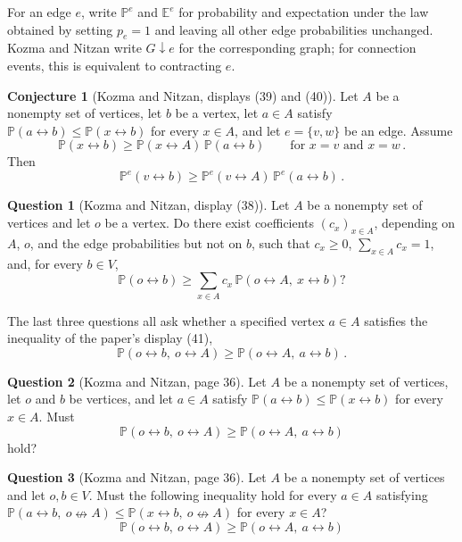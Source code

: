 \documentclass[11pt]{article}
\theoremstyle{definition}
\newtheorem{conjecture}{Conjecture}
\newtheorem{question}{Question}
\theoremstyle{remark}
\newcommand{\PP}{\mathbb P}
\newcommand{\EE}{\mathbb E}
\newcommand{\con}{\leftrightarrow}
\newcommand{\ncon}{\nleftrightarrow}
\begin{document}
For an edge $e$, write $\PP^e$ and $\EE^e$ for probability and expectation under the law
obtained by setting $p_e=1$ and leaving all other edge probabilities unchanged. Kozma and
Nitzan write $G\downarrow e$ for the corresponding graph; for connection events, this is
equivalent to contracting $e$.

\setcounter{conjecture}{5}
\begin{conjecture}[Kozma and Nitzan, displays (39) and (40)]\label{c6}
Let $A$ be a nonempty set of vertices, let $b$ be a vertex, let $a\in A$ satisfy
$\PP(a\con b)\leq\PP(x\con b)$ for every $x\in A$, and let $e=\{v,w\}$ be an edge. Assume
\begin{equation}\label{eq:39}
 \PP(x\con b)\geq \PP(x\con A)\,\PP(a\con b)\qquad\text{for } x=v \text{ and } x=w\,.
\end{equation}
Then
\begin{equation}\label{eq:40}
 \PP^e(v\con b)\geq \PP^e(v\con A)\,\PP^e(a\con b)\,.
\end{equation}
\end{conjecture}

\setcounter{question}{4}
\begin{question}[Kozma and Nitzan, display (38)]\label{q5}
Let $A$ be a nonempty set of vertices and let $o$ be a vertex. Do there exist coefficients
$(c_x)_{x\in A}$, depending on $A$, $o$, and the edge probabilities but not on $b$, such
that $c_x\geq0$, $\sum_{x\in A}c_x=1$, and, for every $b\in V$,
\[
 \PP(o\con b)\geq \sum_{x\in A}c_x\,\PP(o\con A,\ x\con b)?
\]
\end{question}

The last three questions all ask whether a specified vertex $a\in A$ satisfies the
inequality of the paper's display (41),
\begin{equation}\label{eq:41}
 \PP(o\con b,\ o\con A)\geq \PP(o\con A,\ a\con b)\,.
\end{equation}

\setcounter{question}{6}
\begin{question}[Kozma and Nitzan, page 36]\label{q7}
Let $A$ be a nonempty set of vertices, let $o$ and $b$ be vertices, and let $a\in A$
satisfy $\PP(a\con b)\leq\PP(x\con b)$ for every $x\in A$. Must
\[
 \PP(o\con b,\ o\con A)\geq \PP(o\con A,\ a\con b)
\]
hold?
\end{question}

\begin{question}[Kozma and Nitzan, page 36]\label{q8}
Let $A$ be a nonempty set of vertices and let $o,b\in V$. Must the following inequality
hold for every $a\in A$ satisfying
$\PP(a\con b,\ o\ncon A)\leq\PP(x\con b,\ o\ncon A)$ for every $x\in A$?
\[
 \PP(o\con b,\ o\con A)\geq \PP(o\con A,\ a\con b)
\]
\end{question}
\end{document}
